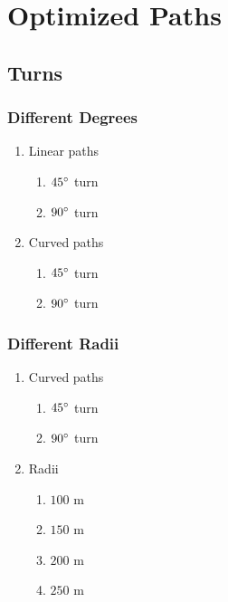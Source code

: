 \chapter{Optimized Paths}



\section{Turns}




\subsection{Different Degrees}

\begin{enumerate}
	\item Linear paths
	\begin{enumerate}
		\item $45 \degree$ turn
		\item $90 \degree$ turn
	\end{enumerate}
	\item Curved paths
	\begin{enumerate}
		\item $45 \degree$ turn
		\item $90 \degree$ turn
	\end{enumerate}
\end{enumerate}

\subsection{Different Radii}

\begin{enumerate}
	\item Curved paths
	\begin{enumerate}
		\item $45 \degree$ turn
		\item $90 \degree$ turn
	\end{enumerate}
	\item Radii
	\begin{enumerate}
		\item $100$ m
		\item $150$ m
		\item $200$ m
		\item $250$ m
	\end{enumerate}
\end{enumerate}

